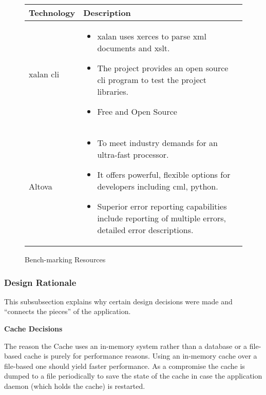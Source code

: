 \begin{figure}[H]
  \centering
  \begin{tabular}{ | l | p{10cm} |}
    \hline
    Technology & Description  \\ \hline
    \gls{xalan} \gls{cli}&
    \begin{itemize}
      \item \gls{xalan} uses \gls{xerces} to parse \gls{xml} documents and \gls{xslt}.
      \item The project provides an open source \gls{cli} program to test the project libraries.
      \item Free and Open Source
    \end{itemize} \\ \hline
    Altova &
    \begin{itemize}
      \item To meet industry demands for an ultra-fast processor.
      \item It offers powerful, flexible options for developers including cml, python.
      \item Superior error reporting capabilities include reporting of multiple errors, detailed error descriptions.
    \end{itemize} \\ \hline
  \end{tabular}
  \caption{Bench-marking Resources}
\end{figure}


\subsubsection{Design Rationale}

This subsubsection explains why certain design decisions were made and ``connects the pieces'' of the application.

\textbf{Cache Decisions}

The reason the Cache uses an in-memory system rather than a database or a file-based cache is purely for performance reasons.
Using an in-memory cache over a file-based one should yield faster performance.
As a compromise the cache is dumped to a file periodically to save the state of the cache in case the application daemon (which holds the cache) is restarted.

